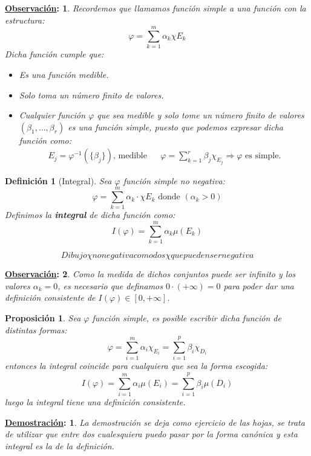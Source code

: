 \documentclass[10pt,a4paper,openright]{book}
\theoremstyle{break}
\newtheorem*{defi}{Definición}
\newtheorem*{prop}{Proposición}
\newtheorem*{demo}{\underline{Demostración}:}
\newtheorem*{obs}{\underline{Observación}:}
\begin{document}
\begin{obs}
Recordemos que llamamos función simple a una función con la estructura:
$$\varphi = \sum_{k=1}^{m} \alpha_k\chi{E_k}$$
Dicha función cumple que:
\begin{itemize}
    \item Es una función medible.
    \item Solo toma un número finito de valores.
    \item Cualquier función $\varphi$ que sea medible y solo tome un número finito de valores $(\beta_1, \ldots, \beta_r)$ es una función simple, puesto que podemos expresar dicha función como:
\begin{align*}
E_j = \varphi^{-1}\left(\{\beta_j\}\right) \text{, medible} & & \varphi = \sum_{k=1}^{r} \beta_j \chi_{E_j} \Rightarrow \varphi \text{ es simple.}
\end{align*}
\end{itemize}
\end{obs}

\begin{defi}[Integral]
Sea $\varphi$ función simple no negativa:
$$\varphi = \sum_{k=1}^{m} \alpha_k \cdot \chi{E_k} \mbox{ donde } \left(\alpha_k > 0\right)$$
Definimos la \textbf{integral} de dicha función como:
$$I\left(\varphi\right) = \sum_{k=1}^{m} \alpha_k \mu\left(E_k\right)$$
\end{defi}
$$Dibujo \chi no negativa como dos \chi que pueden ser negativa$$ 

\begin{obs}
Como la medida de dichos conjuntos puede ser infinito y los valores $\alpha_k = 0$, es necesario que definamos $0 \cdot \left(+ \infty\right) = 0$ para poder dar una definición consistente de $I\left(\varphi\right) \in \left[0, +\infty\right]$.
\end{obs}

\begin{prop}
Sea $\varphi$ función simple, es posible escribir dicha función de distintas formas:
$$\varphi = \sum_{i=1}^{m} \alpha_i \chi_{E_i} = \sum_{i=1}^{p} \beta_i \chi_{D_i}$$
entonces la integral coincide para cualquiera que sea la forma escogida:
$$I(\varphi) = \sum_{i=1}^{m} \alpha_i \mu\left(E_i\right) = \sum_{i=1}^{p} \beta_i \mu\left(D_i\right)$$
luego la integral tiene una definición consistente.
\end{prop}
\begin{demo}
La demostración se deja como ejercicio de las hojas, se trata de utilizar que entre dos cualesquiera puedo pasar por la forma canónica y esta integral es la de la definición.
\end{demo}
\end{document}
